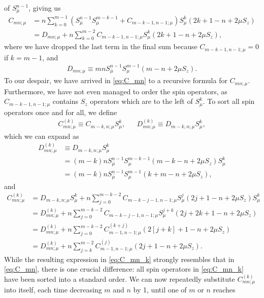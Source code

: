 \documentclass[aps,notitlepage,nofootinbib,11pt]{revtex4-1}
\newcommand{\p}[1]{\left(#1\right)} %
\renewcommand{\sp}[1]{\left[#1\right]} %
\newcommand{\bmu}{{\bar\mu}}
\newcommand{\1}{\mathds{1}}
\begin{document}
of $S_\bmu^{n-1}$, giving us
\begin{align}
  C_{mn;\mu}
  &= n \sum_{k=0}^{m-1}
  \p{S_\bmu^{n-1} S_\mu^{m-k-1} + C_{m-k-1,n-1;\mu}} S_\mu^k
  \p{2k + 1 - n + 2\mu S_z} \\
  &= D_{mn;\mu}
  + n \sum_{k=0}^{m-2} C_{m-k-1,n-1;\mu}
  S_\mu^k \p{2k + 1 - n + 2\mu S_z},
  \label{eq:C_mn}
\end{align}
where we have dropped the last term in the final sum because
$C_{m-k-1,n-1;\mu}=0$ if $k=m-1$, and
\begin{align}
  D_{mn;\mu}
  \equiv mn S_\bmu^{n-1} S_\mu^{m-1} \p{m - n + 2\mu S_z}.
  \label{eq:D_mn}
\end{align}
To our despair, we have arrived in \eqref{eq:C_mn} to a recursive
formula for $C_{mn;\mu}$.  Furthermore, we have not even managed to
order the spin operators, as $C_{m-k-1,n-1;\mu}$ contains $S_z$
operators which are to the left of $S_\mu^k$.  To sort all spin
operators once and for all, we define
\begin{align}
  C_{mn;\mu}^{(k)} \equiv C_{m-k,n;\mu} S_\mu^k,
  &&
  D_{mn;\mu}^{(k)} \equiv D_{m-k,n;\mu} S_\mu^k,
\end{align}
which we can expand as
\begin{align}
  D_{mn;\mu}^{(k)}
  &\equiv D_{m-k,n;\mu}S_\mu^k \\
  &= \p{m-k}n S_\bmu^{n-1} S_\mu^{m-k-1}
  \p{m-k-n+2\mu S_z} S_\mu^k \\
  &= \p{m-k}n S_\bmu^{n-1} S_\mu^{m-1} \p{k+m-n+2\mu S_z},
  \label{eq:D_mn_k}
\end{align}
and
\begin{align}
  C_{mn;\mu}^{(k)}
  &= D_{m-k,n;\mu} S_\mu^k + n \sum_{j=0}^{m-k-2}
  C_{m-k-j-1,n-1;\mu} S_\mu^j \p{2j+1-n+2\mu S_z} S_\mu^k \\
  &= D_{mn;\mu}^{(k)} + n \sum_{j=0}^{m-k-2}
  C_{m-k-j-1,n-1;\mu} S_\mu^{j+k} \p{2j+2k+1-n+2\mu S_z} \\
  &= D_{mn;\mu}^{(k)} + n \sum_{j=0}^{m-k-2}
  C_{m-1,n-1;\mu}^{(k+j)} \p{2\sp{j+k}+1-n+2\mu S_z} \\
  &= D_{mn;\mu}^{(k)} + n \sum_{j=k}^{m-2}
  C_{m-1,n-1;\mu}^{(j)} \p{2j+1-n+2\mu S_z}.
  \label{eq:C_mn_k}
\end{align}
While the resulting expression in \eqref{eq:C_mn_k} strongly resembles
that in \eqref{eq:C_mn}, there is one crucial difference: all spin
operators in \eqref{eq:C_mn_k} have been sorted into a standard order.
We can now repeatedly substitute $C_{mn;\mu}^{(k)}$ into itself, each
time decreasing $m$ and $n$ by 1, until one of $m$ or $n$ reaches
\end{document}
